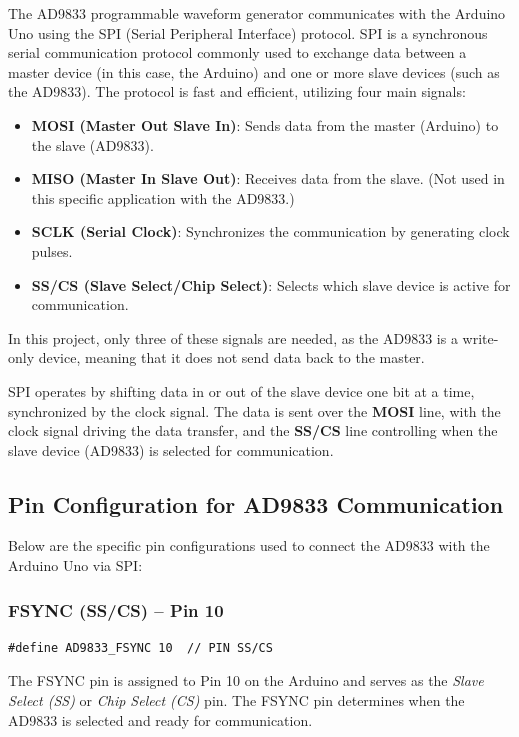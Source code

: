 The AD9833 programmable waveform generator communicates with the Arduino Uno using the SPI (Serial Peripheral Interface) protocol. SPI is a synchronous serial communication protocol commonly used to exchange data between a master device (in this case, the Arduino) and one or more slave devices (such as the AD9833). The protocol is fast and efficient, utilizing four main signals:

\begin{itemize}
    \item \textbf{MOSI (Master Out Slave In)}: Sends data from the master (Arduino) to the slave (AD9833).
    \item \textbf{MISO (Master In Slave Out)}: Receives data from the slave. (Not used in this specific application with the AD9833.)
    \item \textbf{SCLK (Serial Clock)}: Synchronizes the communication by generating clock pulses.
    \item \textbf{SS/CS (Slave Select/Chip Select)}: Selects which slave device is active for communication.
\end{itemize}

In this project, only three of these signals are needed, as the AD9833 is a write-only device, meaning that it does not send data back to the master.

SPI operates by shifting data in or out of the slave device one bit at a time, synchronized by the clock signal. The data is sent over the \textbf{MOSI} line, with the clock signal driving the data transfer, and the \textbf{SS/CS} line controlling when the slave device (AD9833) is selected for communication.

\subsection{Pin Configuration for AD9833 Communication}

Below are the specific pin configurations used to connect the AD9833 with the Arduino Uno via SPI:

\subsubsection{FSYNC (SS/CS) – Pin 10}
\begin{verbatim}
#define AD9833_FSYNC 10  // PIN SS/CS
\end{verbatim}

The FSYNC pin is assigned to Pin 10 on the Arduino and serves as the \textit{Slave Select (SS)} or \textit{Chip Select (CS)} pin. The FSYNC pin determines when the AD9833 is selected and ready for communication.


